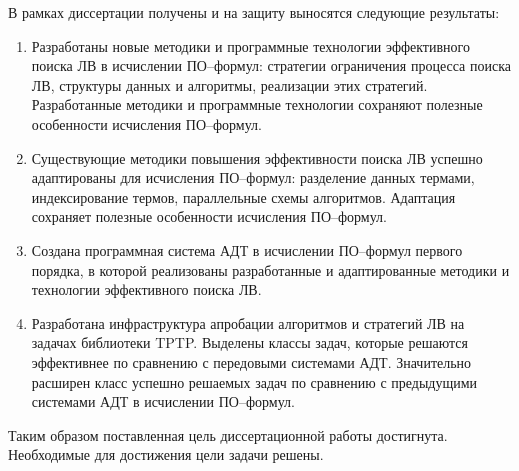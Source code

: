 В рамках диссертации получены и на защиту выносятся следующие результаты:
\begin{enumerate}
\item Разработаны новые методики и программные технологии эффективного поиска ЛВ в исчислении ПО--формул: стратегии ограничения процесса поиска ЛВ, структуры данных и алгоритмы, реализации этих стратегий.  Разработанные методики и программные технологии сохраняют полезные особенности исчисления ПО--формул.

\item Существующие методики повышения эффективности поиска ЛВ успешно адаптированы для исчисления ПО--формул: разделение данных термами, индексирование термов, параллельные схемы алгоритмов. Адаптация сохраняет полезные особенности исчисления ПО--формул.

\item Создана программная система АДТ в исчислении ПО--формул первого порядка, в которой реализованы разработанные и адаптированные методики и технологии эффективного поиска ЛВ.

\item Разработана инфраструктура апробации алгоритмов и стратегий ЛВ на задачах библиотеки TPTP. Выделены классы задач, которые решаются эффективнее по сравнению с  передовыми системами АДТ. Значительно расширен класс успешно решаемых задач по сравнению с предыдущими системами АДТ в исчислении ПО--формул.
\end{enumerate}



Таким образом поставленная цель диссертационной работы достигнута. Необходимые для достижения цели задачи решены.


